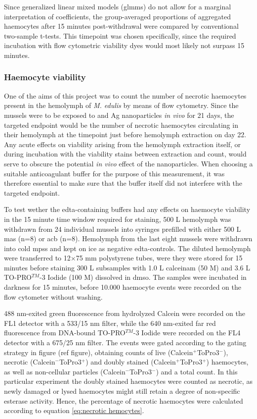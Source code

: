 Since generalized linear mixed models (\acrshort{glmms}) do not allow for a marginal interpretation of coefficients, the group-averaged proportions of aggregated haemocytes after 15 minutes post-withdrawal were compared by conventional two-sample t-tests. This timepoint was chosen specifically, since the required incubation with flow cytometric viability dyes would most likely not surpass 15 minutes.

\subsubsection{Haemocyte viability}
One of the aims of this project was to count the number of necrotic haemocytes present in the hemolymph of \emph{M. edulis} by means of flow cytometry. Since the mussels were to be exposed to  and Ag nanoparticles \emph{in vivo} for 21 days, the targeted endpoint would be the number of necrotic haemocytes circulating in their hemolymph at the timepoint just before hemolymph extraction on day 22. Any acute effects on viability arising from the hemolymph extraction itself, or during incubation with the viability stains between extraction and count, would serve to obscure the potential \emph{in vivo} effect of the nanoparticles. When choosing a suitable anticoagulant buffer for the purpose of this measurement, it was therefore essential to make sure that the buffer itself did not interfere with the targeted endpoint.

To test wether the \acrshort{edta}-containing buffers had any effects on haemocyte viability in the 15 minute time window required for staining, 500 \micro L hemolymph was withdrawn from 24 individual mussels into syringes prefilled with either 500 \micro L \acrshort{mas} (n=8) or \acrshort{acb} (n=8). Hemolymph from the last eight mussels were withdrawn into cold \acrshort{mpss} and kept on ice as negative \acrshort{edta}-controls. The diluted hemolymph were transferred to 12$\times$75 mm polystyrene tubes, were they were stored for 15 minutes before staining 300 \micro L subsamples with 1.0 \micro L \acrshort{calceinam} (50 \micro M) and 3.6 \micro L TO-PRO$^{TM}$-3 Iodide (100 \micro M) dissolved in \acrshort{dmso}. The samples were incubated in darkness for 15 minutes, before 10.000 haemocyte events were recorded on the flow cytometer without washing.

488 nm-exited green fluorescence from hydrolyzed Calcein were recorded on the FL1 detector with a 533/15 nm filter, while the 640 nm-exited far red fluorescence from DNA-bound TO-PRO$^{TM}$-3 Iodide were recorded on the FL4 detector with a 675/25 nm filter. The events were gated according to the gating strategy in figure (ref figure), obtaining counts of live (Calcein$^{+}$ToPro3$^{-}$), necrotic (Calcein$^{-}$ToPro3$^{+}$) and doubly stained (Calcein$^{+}$ToPro3$^{+}$) haemocytes, as well as non-cellular particles (Calcein$^{-}$ToPro3$^{-}$) and a total count. In this particular experiment the doubly stained haemocytes were counted as necrotic, as newly damaged or lysed haemocytes might still retain a degree of non-specific esterase activity. Hence, the percentage of necrotic haemocytes were calculated according to equation \ref{eq:necrotic hemocytes}.

